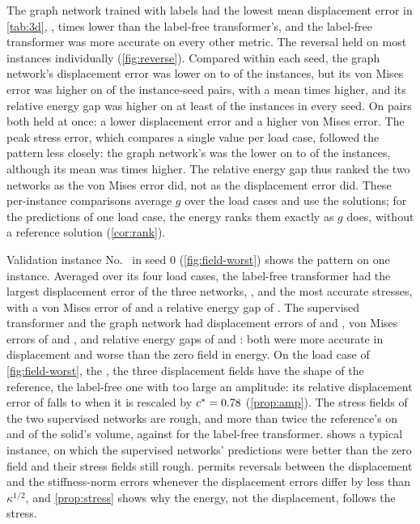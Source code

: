 The graph network trained with labels had the lowest mean displacement error in
\cref{tab:3d}, \numThreeMgnDisp{}, \numThreeFreeOverMgnDisp{} times lower than the
label-free transformer's, and the label-free transformer was more accurate on every other
metric. The reversal held on most instances individually (\cref{fig:reverse}). Compared
within each seed, the graph network's displacement error was lower on
\numMgnDispLowerMin{} to \numMgnDispLowerMax{} of the instances, but its von Mises error was
higher on \numMgnVmHigher{} of the \numThreePairs{} instance-seed pairs, with a mean
\numThreeMgnOverFreeVm{} times higher, and its relative energy gap was higher on at least
\numMgnGapHigherMin{} of the instances in every seed. On \numMgnLowerDispHigherVm{} pairs
both held at once: a lower displacement error and a higher von Mises error. The peak stress
error, which compares a single value per load case, followed the pattern less closely: the
graph network's was the lower on \numMgnPeakLowerMin{} to \numMgnPeakLowerMax{} of the
instances, although its mean was \numThreeMgnOverFreePeak{} times higher. The relative
energy gap thus ranked the two networks as the von Mises error did, not as the displacement
error did. These per-instance comparisons average $g$ over the load cases and use the
solutions; for the predictions of one load case, the energy ranks them exactly as $g$ does,
without a reference solution (\cref{cor:rank}).

Validation instance No.~\numWorstIndex{} in seed 0 (\cref{fig:field-worst}) shows the
pattern on one instance. Averaged over its four load cases, the label-free transformer had
the largest displacement error of the three networks, \numWorstFreeDisp{}, and the most
accurate stresses, with a von Mises error of \numWorstFreeVm{} and a relative energy gap of
\numWorstFreeGap{}. The supervised transformer and the graph network had displacement
errors of \numWorstLabDisp{} and \numWorstMgnDisp{}, von Mises errors of \numWorstLabVm{}
and \numWorstMgnVm{}, and relative energy gaps of \numWorstLabGap{} and \numWorstMgnGap{}:
both were more accurate in displacement and worse than the zero field in energy. On the
load case of \cref{fig:field-worst}, the \numFigWorstLoad{}, the three displacement fields
have the shape of the reference, the label-free one with too large an amplitude: its
relative displacement error of \numFigWorstFreeDisp{} falls to \numFigWorstFreeDispC{} when
it is rescaled by $c^{\ast}=0.78{}$ (\cref{prop:amp}). The stress fields of the
two supervised networks are rough, and more than twice the reference's on
\numFigWorstTwiceLab{} and \numFigWorstTwiceMgn{} of the solid's volume, against
\numFigWorstTwiceFree{} for the label-free transformer.  shows a
typical instance, on which the supervised networks' predictions were better than the zero
field and their stress fields still rough.  permits reversals between the
displacement and the stiffness-norm errors whenever the displacement errors differ by less
than $\kappa^{1/2}$, and \cref{prop:stress} shows why the energy, not the displacement,
follows the stress.

